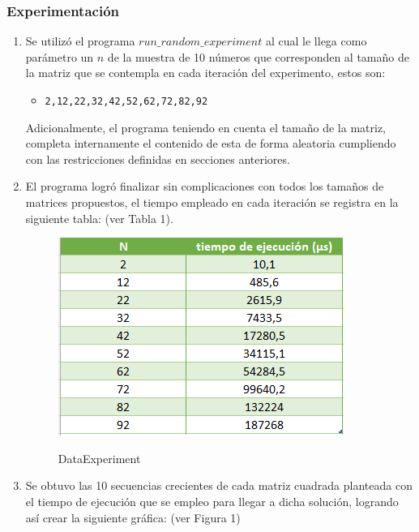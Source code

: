 \documentclass[letter]{article}
\begin{document}
\subsubsection{Experimentación}
\begin{enumerate}
    \item Se utilizó el programa \texttt{$run\_random\_experiment$} al cual le llega como parámetro un $n$ de la muestra de 10 números que corresponden al tamaño de la matriz que se contempla en cada iteración del experimento, estos son:
    \begin{itemize}
        \item \texttt{2,12,22,32,42,52,62,72,82,92} 
    \end{itemize}

Adicionalmente, el programa teniendo en cuenta el tamaño de la matriz, completa internamente el contenido de esta de forma aleatoria cumpliendo con las restricciones definidas en secciones anteriores.
    
    \item El programa logró finalizar sin complicaciones con todos los tamaños de matrices propuestos, el tiempo empleado en cada iteración se registra en la siguiente tabla: (ver Tabla 1).
    
    \begin{figure}[h]
    \centering
    \includegraphics[scale=1]{Data.png}
    \label{experimentos:aleatorias:grafica}
     \caption{DataExperiment}
\end{figure}
    
    \item Se obtuvo las 10 secuencias crecientes de cada matriz cuadrada planteada con el tiempo de ejecución que se empleo para llegar a dicha solución, logrando así crear la siguiente gráfica: (ver Figura 1)
    
    \newpage
    

\end{enumerate}
\end{document}
